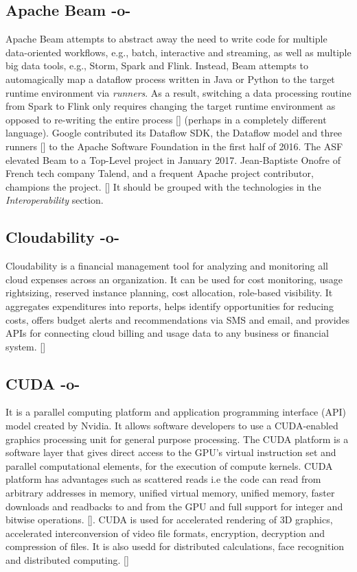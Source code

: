 \subsection{Apache Beam -o-}

Apache Beam attempts to abstract away the need to write code for
multiple data-oriented workflows, e.g., batch, interactive and
streaming, as well as multiple big data tools, e.g., Storm, Spark and
Flink.  Instead, Beam attempts to automagically map a dataflow process
written in Java or Python to the target runtime environment via
\textit{runners}.  As a result, switching a data processing routine from
Spark to Flink only requires changing the target runtime environment
as opposed to re-writing the entire
process [\cite{www-infoworld-apachebeam}] (perhaps in a completely
different language).  Google contributed its Dataflow SDK, the
Dataflow model and three runners [\cite{www-datanami-apachebeam}] to the
Apache Software Foundation in the first half of 2016.  The ASF
elevated Beam to a Top-Level project in January 2017.  Jean-Baptiste
Onofre of French tech company Talend, and a frequent Apache project
contributor, champions the project. [\cite{www-talend-apachebeam}] It
should be grouped with the technologies in the \textit{Interoperability}
section.

\subsection{Cloudability -o-}

Cloudability is a financial management tool for analyzing and
monitoring all cloud expenses across an organization. It can be used
for cost monitoring, usage rightsizing, reserved instance planning,
cost allocation, role-based visibility. It aggregates expenditures
into reports, helps identify opportunities for reducing costs, offers
budget alerts and recommendations via SMS and email, and provides APIs
for connecting cloud billing and usage data to any business or
financial system. [\cite{www-cloudability}]



\subsection{CUDA -o-}

It is a parallel computing platform and application programming
interface (API) model created by Nvidia. It allows software developers
to use a CUDA-enabled graphics processing unit for general purpose
processing. The CUDA platform is a software layer that gives direct
access to the GPU's virtual instruction set and parallel computational
elements, for the execution of compute kernels.  CUDA platform has
advantages such as scattered reads i.e the code can read from
arbitrary addresses in memory, unified virtual memory, unified memory,
faster downloads and readbacks to and from the GPU and full support
for integer and bitwise operations. [\cite{www-cuda-wikipedia}].  CUDA
is used for accelerated rendering of 3D graphics, accelerated
interconversion of video file formats, encryption, decryption and
compression of files.  It is also usedd for distributed calculations,
face recognition and distributed computing. [\cite{www-cuda-wikipedia}]
    

